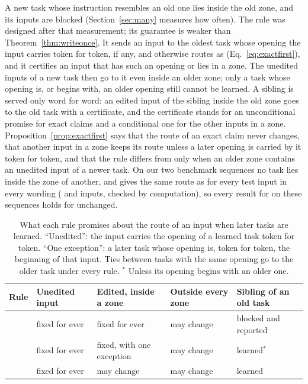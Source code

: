 A new task whose instruction resembles an old one lies inside the old zone, and its inputs are
blocked (Section~\ref{sec:many} measures how often). The rule \exactfirst{} was designed after that
measurement; its guarantee is weaker than Theorem~\ref{thm:writeonce}. It sends an input to the
oldest task whose opening the input carries token for token, if any, and otherwise routes as
\cert{} (Eq.~\eqref{eq:exactfirst}), and it certifies an input that has such an opening or lies in
a zone. The unedited inputs of a new task then go to it even inside an older zone; only a task
whose opening is, or begins with, an older opening still cannot be learned. A sibling is served only
word for word: an edited input of the sibling inside the old zone goes to the old task with a
certificate, and the certificate stands for an unconditional promise for exact claims and a
conditional one for the other inputs in a zone. Proposition~\ref{prop:exactfirst} says that the
route of an exact claim never changes, that another input in a zone keeps its route unless a later
opening is carried by it token for token, and that the rule differs from \cert{} only when an older
zone contains an unedited input of a newer task. On our two benchmark sequences no task lies inside
the zone of another, and \exactfirst{} gives the same route as \cert{} for every test input in
every wording (\ExactSameFive{} and \ExactSameFifteen{} inputs, checked by computation), so every
result for \cert{} on these sequences holds for \exactfirst{} unchanged.

\begin{table}[t]
  \caption{What each rule promises about the route of an input when later tasks are learned.
  ``Unedited'': the input carries the opening of a learned task token for token. ``One exception'':
  a later task whose opening is, token for token, the beginning of that input. Ties between tasks
  with the same opening go to the older task under every rule. $^*$ Unless its opening begins with an older one.}
  \label{tab:guarantees}
  \centering
  \footnotesize
  \setlength{\tabcolsep}{4pt}
  \begin{tabular}{lllll}
    \toprule
    Rule & Unedited input & Edited, inside a zone & Outside every zone & Sibling of an old task \\
    \midrule
    \cert{} & fixed for ever & fixed for ever & may change & blocked and reported \\
    \exactfirst{} & fixed for ever & fixed, with one exception & may change & learned$^*$ \\
    \nearest{} & fixed for ever & may change & may change & learned \\
    \bottomrule
  \end{tabular}
\end{table}

